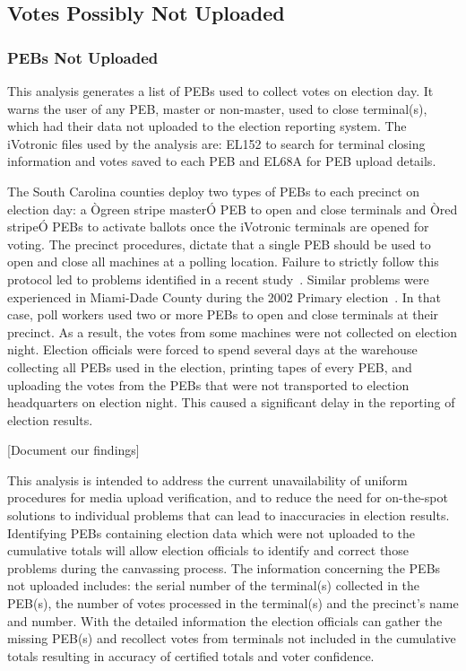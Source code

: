 \subsection{Votes Possibly Not Uploaded}
\subsubsection{PEBs Not Uploaded}
This analysis generates a list of PEBs used to collect votes on election day. It warns the user of any PEB, master or non-master, used to close terminal(s), which had their data not uploaded to the election reporting system.  The iVotronic files used by the analysis are: EL152 to search for terminal closing information and votes saved to each PEB and EL68A for PEB upload details.

The South Carolina counties deploy two types of PEBs to each precinct on election day: a Ògreen stripe masterÓ PEB to open and close terminals and Òred stripeÓ PEBs to activate ballots once the iVotronic terminals are opened for voting. The precinct procedures, dictate that a single PEB should be used to open and close all machines at a polling location. Failure to strictly follow this protocol led to problems identified in a recent study~\cite{Buell2011}.  Similar problems were experienced in Miami-Dade County during the 2002 Primary election~\cite{Mazella2002}. In that case, poll workers used two or more PEBs to open and close terminals at their precinct.  As a result, the votes from some machines were not collected on election night.  Election officials were forced to spend several days at the warehouse collecting all PEBs used in the election, printing tapes of every PEB, and uploading the votes from the PEBs that were not transported to election headquarters on election night. This caused a significant delay in the reporting of election results. 

[Document our findings]

This analysis is intended to address the current unavailability of uniform procedures for media upload verification, and to reduce the need for on-the-spot solutions to individual problems that can lead to inaccuracies in election results. Identifying PEBs containing election data which were not uploaded to the cumulative totals will allow election officials to identify and correct those problems during the canvassing process. The information concerning the PEBs not uploaded includes: the serial number of the terminal(s) collected in the PEB(s), the number of votes processed in the terminal(s) and the precinct's name and number. With the detailed information the election officials can gather the missing PEB(s) and recollect votes from terminals not included in the cumulative totals resulting in accuracy of certified totals and voter confidence.

